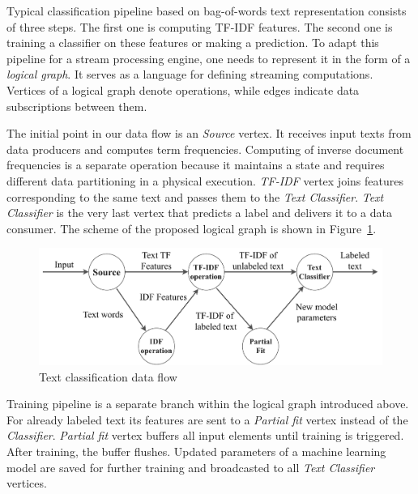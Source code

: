 \label {fs-dataflow}

Typical classification pipeline based on bag-of-words text representation consists of three steps. The first one is computing TF-IDF features. The second one is training a classifier on these features or making a prediction. To adapt this pipeline for a stream processing engine, one needs to represent it in the form of a {\em logical graph}. It serves as a language for defining streaming computations. Vertices of a logical graph denote operations, while edges indicate data subscriptions between them. 

The initial point in our data flow is an {\em Source} vertex. It receives input texts from data producers and computes term frequencies. Computing of inverse document frequencies is a separate operation because it maintains a state and requires different data partitioning in a physical execution. {\em TF-IDF} vertex joins features corresponding to the same text and passes them to the {\em Text Classifier}. {\em Text Classifier} is the very last vertex that predicts a label and delivers it to a data consumer. The scheme of the proposed logical graph is shown in Figure~\ref{logical_graph}.

\begin{figure}[htbp]
  \centering
  \includegraphics[scale=0.38]{pics/logical-graph}
  \caption{Text classification data flow}
  \label {logical_graph}
\end{figure}

Training pipeline is a separate branch within the logical graph introduced above. For already labeled text its features are sent to a {\em Partial fit} vertex instead of the {\em Classifier}. {\em Partial fit} vertex buffers all input elements until training is triggered. After training, the buffer flushes. Updated parameters of a machine learning model are saved for further training and broadcasted to all {\em Text Classifier} vertices.